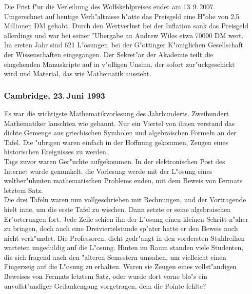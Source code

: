 \documentclass[11pt]{article}
\begin{document}
\medskip

Die Frist f"ur die Verleihung des Wolfskehlpreises endet am 13.\,9.\,2007.
Umgerechnet auf heutige Verh"altnisse h"atte das Preisgeld eine 
H"ohe von 2,5 Millionen DM gehabt.
Durch den Wertverlust bei der Inflation sank das Preisgeld allerdings und war
bei seiner "Ubergabe an Andrew Wiles etwa 70000 DM wert.
Im ersten Jahr sind 621 \glqq L"osungen\grqq\  bei der G"ottinger K"oniglichen
Gesellschaft der Wissenschaften eingegangen. Der Sekret"ar der Akademie teilt
die eingehenden Manuskripte auf in
 v"olligen Unsinn, der sofort zur"uckgeschickt wird und
Material, das wie Mathematik aussieht.
\subsubsection*{Cambridge, 23.\,Juni 1993}
Es war die wichtigste Mathematikvorlesung des Jahrhunderts. Zweihundert 
Mathematiker lauschten wie gebannt. Nur ein Viertel von ihnen verstand das 
dichte Gemenge aus griechischen Symbolen und algebraischen Formeln an der 
Tafel. Die "ubrigen waren einfach in der Hoffnung gekommen, Zeugen eines 
historischen Ereignisses zu werden. 
\\
Tags zuvor waren Ger"uchte aufgekommen. In der elektronischen Post des Internet 
wurde gemunkelt, die Vorlesung werde mit der L"osung eines weltber"uhmten 
mathematischen Problems enden, mit dem Beweis von Fermats letztem Satz.
\\
Die drei Tafeln waren nun vollgeschrieben mit Rechnungen, und der Vortragende 
hielt inne, um die erste Tafel zu wischen. Dann setzte er seine algebraischen 
Er"orterungen fort. Jede Zeile schien ihn der L"osung einen kleinen Schritt 
n"aher zu bringen, doch auch eine Dreiviertelstunde sp"ater hatte er den Beweis 
noch nicht verk"undet. Die Professoren, dicht gedr"angt in den vordersten 
Stuhlreihen warteten ungeduldig auf die L"osung. Hinten im Raum standen viele 
Studenten, die sich fragend nach den "alteren Semestern umsahen, um vielleicht 
einen Fingerzeig auf die L"osung zu erhalten. Waren sie Zeugen eines 
vollst"andigen Beweises von Fermats letztem Satz, oder wurde dort vorne blo"s 
ein unvollst"andiger Gedankengang vorgetragen, dem die Pointe fehlte?
\end{document}
